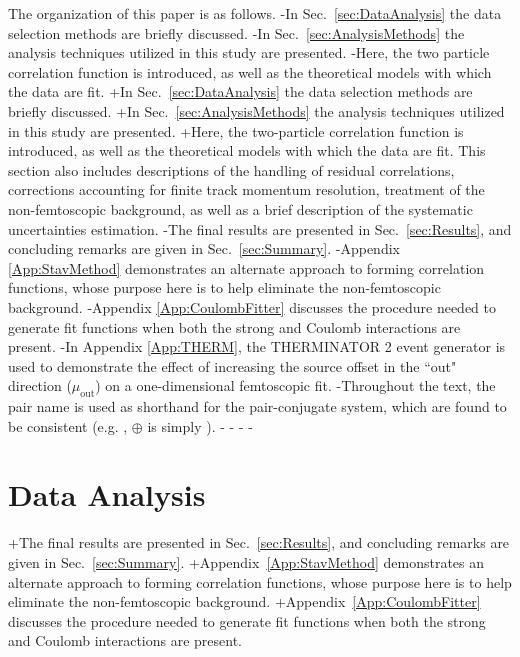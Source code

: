  The organization of this paper is as follows.  
-In Sec.\ \ref{sec:DataAnalysis} the data selection methods are briefly discussed.
-In Sec.\ \ref{sec:AnalysisMethods} the analysis techniques utilized in this study are presented.  
-Here, the two particle correlation function is introduced, as well as the theoretical models with which the data are fit.  
+In Sec.~\ref{sec:DataAnalysis} the data selection methods are briefly discussed.
+In Sec.~\ref{sec:AnalysisMethods} the analysis techniques utilized in this study are presented.  
+Here, the two-particle correlation function is introduced, as well as the theoretical models with which the data are fit.  
 This section also includes descriptions of the handling of residual correlations, corrections accounting for finite track momentum resolution, treatment of the non-femtoscopic background, as well as a brief description of the systematic uncertainties estimation.  
-The final results are presented in Sec.\ \ref{sec:Results}, and concluding remarks are given in Sec.\ \ref{sec:Summary}.
-Appendix \ref{App:StavMethod} demonstrates an alternate approach to forming correlation functions, whose purpose here is to help eliminate the non-femtoscopic background.
-Appendix \ref{App:CoulombFitter} discusses the procedure needed to generate fit functions when both the strong and Coulomb interactions are present.
-In Appendix \ref{App:THERM}, the THERMINATOR 2 event generator is used to demonstrate the effect of increasing the source offset in the ``out" direction ($\mu_{\mathrm{out}}$) on a one-dimensional femtoscopic fit.
-Throughout the text, the pair name is used as shorthand for the pair-conjugate system, which are found to be consistent (e.g. \LamKs, \LamKchP $\oplus$ \ALamKchM is simply \LamKchP).
-
-%
-%
-\section{Data Analysis}
+The final results are presented in Sec.~\ref{sec:Results}, and concluding remarks are given in Sec.~\ref{sec:Summary}.
+Appendix~\ref{App:StavMethod} demonstrates an alternate approach to forming correlation functions, whose purpose here is to help eliminate the non-femtoscopic background.
+Appendix~\ref{App:CoulombFitter} discusses the procedure needed to generate fit functions when both the strong and Coulomb interactions are present.
